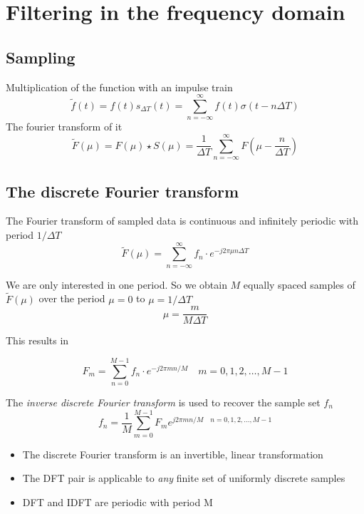\section{Filtering in the frequency domain }
\subsection{Sampling }
Multiplication of the function with an impulse train
\begin{equation}
\tilde{f}(t) = f(t) s_{\Delta T}(t) = \sum_{n=-\infty}^{\infty}f(t)\sigma (t-n \Delta T)
\end{equation}
The fourier transform of it
\begin{equation}
\tilde{F}(\mu) = F(\mu) \star S(\mu) = \frac{1}{\Delta T} \sum_{n=-\infty}^{\infty}F\left(\mu - \frac{n}{\Delta T}\right)
\end{equation}

\subsection{The discrete Fourier transform }
The Fourier transform of sampled data is continuous and infinitely periodic with period $1/\Delta T$
\begin{equation}
\tilde{F}(\mu)= \sum_{n=-\infty}^{\infty} f_n \cdot e^{-j 2 \pi  \mu n \Delta T}
\end{equation}

We are only interested in one period.
So we obtain $M$ equally spaced samples of $\tilde{F}(\mu)$ over the period $\mu = 0$ to $\mu = 1/\Delta T$
\begin{equation}
\mu = \frac{m}{M \Delta T}
\end{equation}

This results in

\begin{equation}
F_m = \sum_{n=0}^{M-1} f_n \cdot e^{-j 2 \pi m n / M} \quad m = 0,1,2,\dots,M-1
\end{equation}
 
The \emph{inverse discrete Fourier transform} is used to recover the sample set ${f_n}$
\begin{equation}
f_n = \frac{1}{M} \sum_{m=0}^{M-1}F_m e^{j 2 \pi m n / M \quad n = 0,1,2,\dots,M-1}
\end{equation}

\begin{itemize}
\item The discrete Fourier transform is an invertible, linear transformation
\item The DFT pair is applicable to \emph{any} finite set of uniformly discrete samples
\item DFT and IDFT are periodic with period M
\end{itemize}
 
